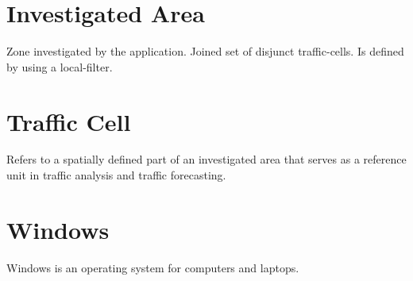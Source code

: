 \documentclass[parskip=full]{report} %
\begin{document}
\section*{Investigated Area}
Zone investigated by the application. Joined set of disjunct traffic-cells. Is defined by using a local-filter.

\section*{Traffic Cell}
Refers to a spatially defined part of an investigated area that serves as a reference unit in traffic analysis and traffic forecasting.

\section*{Windows}
Windows is an operating system for computers and laptops.
\end{document}
